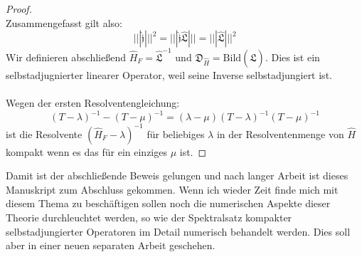 \documentclass[11pt,a4paper,leqno]{report}
\numberwithin{equation}{chapter}
\begin{document}
\begin{proof}
\\
Zusammengefasst gilt also:
\begin{equation*}
	|||\hat{\mathfrak{j}}|||^2=|||\hat{\mathfrak{j}}\hat{\mathfrak{L}}|||=|||\hat{\mathfrak{L}}|||^2
\end{equation*}
Wir definieren abschließend $\hat{H}_F=\hat{\mathfrak{L}}^{-1}$ und $\mathfrak{D}_{\hat{H}}=\mathrm{Bild}(\hat{\mathfrak{L}})$. Dies ist ein selbstadjugnierter linearer Operator, weil seine Inverse selbstadjungiert ist.
\\
\\
Wegen der ersten Resolventengleichung:
\begin{equation*}
	(T-\lambda )^{-1}-(T-\mu )^{-1}= (\lambda-\mu)(T-\lambda )^{-1}(T-\mu )^{-1}
\end{equation*}
ist die Resolvente $(\hat{H}_F-\lambda)^{-1}$ für beliebiges $\lambda$ in der Resolventenmenge von $\hat{H}$ kompakt wenn es das für ein einziges $\mu$ ist.	
\end{proof}
\noindent
Damit ist der abschließende Beweis gelungen und nach langer Arbeit ist dieses Manuskript zum Abschluss gekommen. Wenn ich wieder Zeit finde mich mit diesem Thema zu beschäftigen sollen noch die numerischen Aspekte dieser Theorie durchleuchtet werden, so wie der Spektralsatz kompakter selbstadjungierter Operatoren im Detail numerisch behandelt werden. Dies soll aber in einer neuen separaten Arbeit geschehen.
\end{document}
